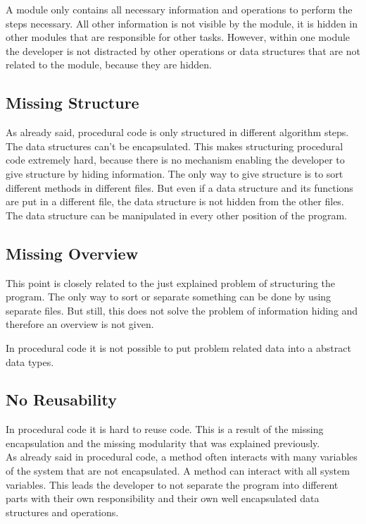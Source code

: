 A module only contains all necessary information and operations to perform the steps necessary. All other information is not visible by the module, it is hidden in other modules that are responsible for other tasks. However, within one module the developer is not distracted by other operations or data structures that are not related to the module, because they are hidden. 

\subsection*{Missing Structure}
As already said, procedural code is only structured in different algorithm steps. The data structures can't be encapsulated. This makes structuring procedural code extremely hard, because there is no mechanism enabling the developer to give structure by hiding information. The only way to give structure is to sort different methods in different files. But even if a data structure and its functions are put in a different file, the data structure is not hidden from the other files. The data structure can be manipulated in every other position of the program.

\subsection*{Missing Overview}
This point is closely related to the just explained problem of structuring the program. The only way to sort or separate something can be done by using separate files. But still, this does not solve the problem of information hiding and therefore an overview is not given.

In procedural code it is not possible to put problem related data into a abstract data types.

\subsection*{No Reusability}
In procedural code it is hard to reuse code. This is a result of the missing encapsulation and the missing modularity that was explained previously.\\

As already said in procedural code, a method often interacts with many variables of the system that are not encapsulated. A method can interact with all system variables. This leads the developer to not separate the program into different parts with their own responsibility and their own well encapsulated data structures and operations. \\

